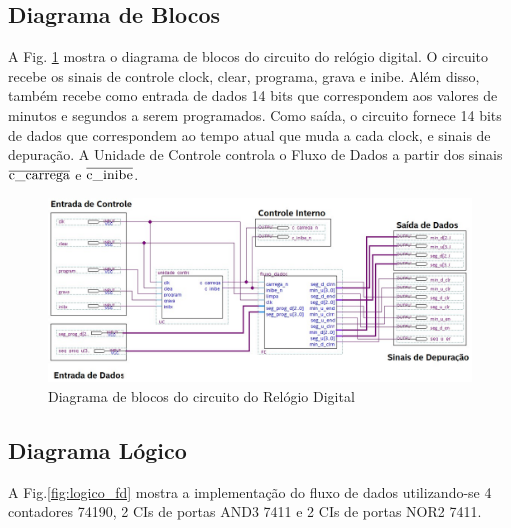 \documentclass[a4,12pt]{horizon-theme}
\begin{document}
\subsection{Diagrama de Blocos}
    A Fig. \ref{fig:blocos} mostra o diagrama de blocos do circuito do relógio digital. O circuito recebe os sinais de controle clock, clear, programa, grava e inibe. Além disso, também recebe como entrada de dados 14 bits que correspondem aos valores de minutos e segundos a serem programados. Como saída, o circuito fornece 14 bits de dados que correspondem ao tempo atual que muda a cada clock, e sinais de depuração. A Unidade de Controle controla o Fluxo de Dados a partir dos sinais $\overline{\textrm{c\_carrega}}$ e $\overline{\textrm{c\_inibe}}$.

    \begin{figure}[!ht]
        \centering
        \includegraphics[width=1\textwidth]{diagrama_blocos.jpg}
        \caption{Diagrama de blocos do circuito do Relógio Digital}
        \label{fig:blocos}
    \end{figure}


\subsection{Diagrama Lógico}
    A Fig.\ref{fig:logico_fd} mostra a implementação do fluxo de dados utilizando-se 4 contadores 74190, 2 CIs de portas AND3 7411 e 2 CIs de portas NOR2 7411.
    
\end{document}
